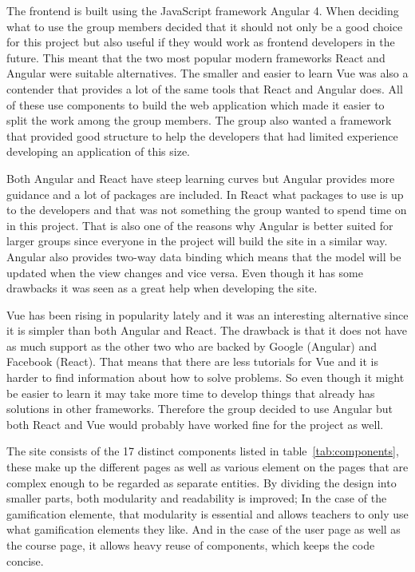 The frontend is built using the JavaScript framework Angular 4. When deciding what to use the group members decided that it should not only be a good choice for this project but also useful if they would work as frontend developers in the future. This meant that the two most popular modern frameworks React and Angular were suitable alternatives. The smaller and easier to learn Vue was also a contender that provides a lot of the same tools that React and Angular does. All of these use components to build the web application which made it easier to split the work among the group members. The group also wanted a framework that provided good structure to help the developers that had limited experience developing an application of this size.

Both Angular and React have steep learning curves but Angular provides more guidance and a lot of packages are included\cite{jensneuhaus}. In React what packages to use is up to the developers and that was not something the group wanted to spend time on in this project. That is also one of the reasons why Angular is better suited for larger groups since everyone in the project will build the site in a similar way. Angular also provides two-way data binding which means that the model will be updated when the view changes and vice versa\cite{jensneuhaus}. Even though it has some drawbacks it was seen as a great help when developing the site.

Vue has been rising in popularity lately and it was an interesting alternative since it is simpler than both Angular and React. The drawback is that it does not have as much support as the other two who are backed by Google (Angular) and Facebook (React). That means that there are less tutorials for Vue and it is harder to find information about how to solve problems\cite{clockwise}. So even though it might be easier to learn it may take more time to develop things that already has solutions in other frameworks. Therefore the group decided to use Angular but both React and Vue would probably have worked fine for the project as well.

The site consists of the 17 distinct components listed in table~\ref{tab:components}, these make up the different pages as well as various element on the pages that are complex enough to be regarded as separate entities. By dividing the design into smaller parts, both modularity and readability is improved; In the case of the gamification elemente, that modularity is essential and allows teachers to only use what gamification elements they like. And in the case of the user page as well as the course page, it allows heavy reuse of components, which keeps the code concise.

